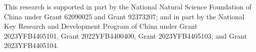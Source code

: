 \documentclass[sigconf,10pt]{acmart}
\begin{document}
\begin{acks}
  This research is supported in part by the National Natural Science Foundation of China under Grant 62090025 and Grant 92373207; and in part by the National Key Research and Development Program of China under Grant 2023YFB4405101, Grant 2022YFB4400400, Grant 2023YFB4405103, and Grant 2023YFB4405104.
\end{acks}



\end{document}
